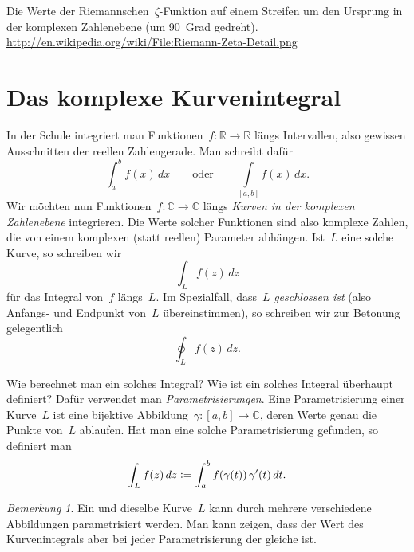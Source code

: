 \documentclass[twoside]{../zirkelblatt1415}
\theoremstyle{definition}
\theoremstyle{plain}
\theoremstyle{remark}
\newtheorem{bem}[defn]{Bemerkung}
\newcommand{\defeq}{\vcentcolon=}
\newcommand{\RR}{\mathbb{R}}
\newcommand{\CC}{\mathbb{C}}
\begin{document}

\begin{center}

\vspace{0.4cm}
\begin{minipage}{0.9\textwidth}
\scriptsize Die Werte der Riemannschen~$\zeta$-Funktion auf einem Streifen um den
Ursprung in der komplexen Zahlen\-ebene (um 90~Grad gedreht).
\url{http://en.wikipedia.org/wiki/File:Riemann-Zeta-Detail.png}\par
\end{minipage}
\end{center}

\vspace{1em}
{\renewcommand{\addvspace}[1]{\vskip0.6em}
\tableofcontents%
}


\section{Das komplexe Kurvenintegral}

In der Schule integriert man Funktionen~$f : \RR \to \RR$ längs Intervallen,
also gewissen Ausschnitten der reellen Zahlengerade. Man schreibt dafür
\[ \int_a^b f(x) \,dx \qquad\text{oder}\qquad \int\limits_{[a,b]} f(x) \,dx. \]
Wir möchten nun Funktionen~$f : \CC \to \CC$ längs \emph{Kurven in der
komplexen Zahlenebene} integrieren. Die Werte solcher Funktionen sind also
komplexe Zahlen, die von einem komplexen (statt reellen) Parameter abhängen.
Ist~$L$ eine solche Kurve, so schreiben wir \[ \int_L f(z) \,dz \] für das
Integral von~$f$ längs~$L$. Im Spezialfall, dass~$L$ \emph{geschlossen ist}
(also Anfangs- und Endpunkt von~$L$ übereinstimmen), so schreiben wir zur
Betonung gelegentlich \[ \oint_L f(z) \,dz. \]

Wie berechnet man ein solches Integral? Wie ist ein solches Integral überhaupt
definiert? Dafür verwendet man \emph{Parametrisierungen}. Eine Parametrisierung
einer Kurve~$L$ ist eine bijektive Abbildung~$\gamma : [a,b] \to \CC$, deren
Werte genau die Punkte von~$L$ ablaufen. Hat man eine solche Parametrisierung
gefunden, so definiert man
\[ \int_L f(z) \,dz \defeq \int_a^b f(\gamma(t)) \, \gamma'(t) \,dt. \]

\begin{bem}Ein und dieselbe Kurve~$L$ kann durch mehrere verschiedene
Abbildungen parametrisiert werden. Man kann zeigen, dass der Wert des
Kurvenintegrals aber bei jeder Parametrisierung der gleiche ist.\end{bem}
\end{document}

